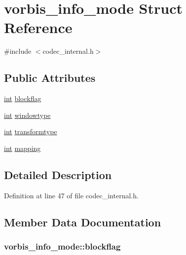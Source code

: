 \hypertarget{structvorbis__info__mode}{}\section{vorbis\+\_\+info\+\_\+mode Struct Reference}
\label{structvorbis__info__mode}


{\ttfamily \#include $<$codec\+\_\+internal.\+h$>$}

\subsection*{Public Attributes}
\begin{DoxyCompactItemize}
\item 
\hyperlink{xmltok_8h_a5a0d4a5641ce434f1d23533f2b2e6653}{int} \hyperlink{structvorbis__info__mode_acbc199dd5fcab1ee31d3d5832e3a0c09}{blockflag}
\item 
\hyperlink{xmltok_8h_a5a0d4a5641ce434f1d23533f2b2e6653}{int} \hyperlink{structvorbis__info__mode_a32132c50e4b3e8c4c0715894f8380502}{windowtype}
\item 
\hyperlink{xmltok_8h_a5a0d4a5641ce434f1d23533f2b2e6653}{int} \hyperlink{structvorbis__info__mode_a2f9fcbf43679f83f8fc9a5c6ade085ef}{transformtype}
\item 
\hyperlink{xmltok_8h_a5a0d4a5641ce434f1d23533f2b2e6653}{int} \hyperlink{structvorbis__info__mode_a902c7f0a9aef3856261a62797d504fff}{mapping}
\end{DoxyCompactItemize}


\subsection{Detailed Description}


Definition at line 47 of file codec\+\_\+internal.\+h.



\subsection{Member Data Documentation}
\subsubsection[{\texorpdfstring{blockflag}{blockflag}}]{ vorbis\+\_\+info\+\_\+mode\+::blockflag}\hypertarget{structvorbis__info__mode_acbc199dd5fcab1ee31d3d5832e3a0c09}{}\label{structvorbis__info__mode_acbc199dd5fcab1ee31d3d5832e3a0c09}


